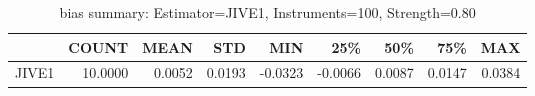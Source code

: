 \begin{table}[ht]
\centering
\caption{bias summary: Estimator=JIVE1, Instruments=100, Strength=0.80}
\begin{tabular}{lrrrrrrrr}
\toprule
 & COUNT & MEAN & STD & MIN & 25\% & 50\% & 75\% & MAX \\
\midrule
JIVE1 & 10.0000 & 0.0052 & 0.0193 & -0.0323 & -0.0066 & 0.0087 & 0.0147 & 0.0384 \\
\bottomrule
\end{tabular}
\end{table}
